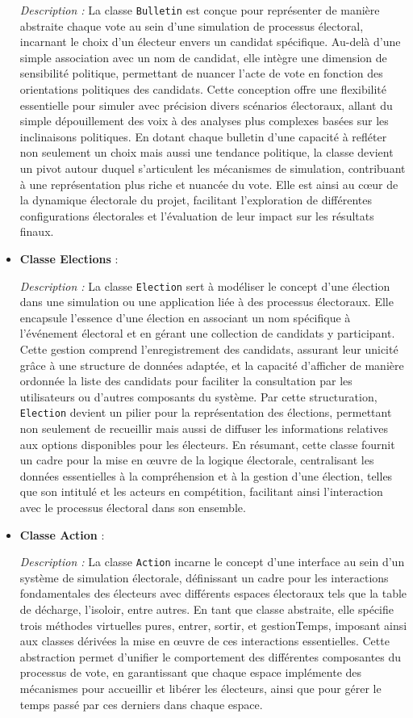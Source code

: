 \documentclass[12pt]{article} %
\begin{document}
\begin{itemize}[leftmargin=*,label={}]
	\textit{Description :} La classe \texttt{Bulletin} est conçue pour représenter de manière abstraite chaque vote au sein d'une simulation de processus électoral, incarnant le choix d'un électeur envers un candidat spécifique. Au-delà d'une simple association avec un nom de candidat, elle intègre une dimension de sensibilité politique, permettant de nuancer l'acte de vote en fonction des orientations politiques des candidats. Cette conception offre une flexibilité essentielle pour simuler avec précision divers scénarios électoraux, allant du simple dépouillement des voix à des analyses plus complexes basées sur les inclinaisons politiques. En dotant chaque bulletin d'une capacité à refléter non seulement un choix mais aussi une tendance politique, la classe devient un pivot autour duquel s'articulent les mécanismes de simulation, contribuant à une représentation plus riche et nuancée du vote. Elle est ainsi au cœur de la dynamique électorale du projet, facilitant l'exploration de différentes configurations électorales et l'évaluation de leur impact sur les résultats finaux.
	\item \textbf{Classe Elections} :
	
	\textit{Description :} La classe \texttt{Election} sert à modéliser le concept d'une élection dans une simulation ou une application liée à des processus électoraux. Elle encapsule l'essence d'une élection en associant un nom spécifique à l'événement électoral et en gérant une collection de candidats y participant. Cette gestion comprend l'enregistrement des candidats, assurant leur unicité grâce à une structure de données adaptée, et la capacité d'afficher de manière ordonnée la liste des candidats pour faciliter la consultation par les utilisateurs ou d'autres composants du système. Par cette structuration, \texttt{Election} devient un pilier pour la représentation des élections, permettant non seulement de recueillir mais aussi de diffuser les informations relatives aux options disponibles pour les électeurs. En résumant, cette classe fournit un cadre pour la mise en œuvre de la logique électorale, centralisant les données essentielles à la compréhension et à la gestion d'une élection, telles que son intitulé et les acteurs en compétition, facilitant ainsi l'interaction avec le processus électoral dans son ensemble.
	
	\item \textbf{Classe Action} :
	
	\textit{Description :} La classe \texttt{Action} incarne le concept d'une interface au sein d'un système de simulation électorale, définissant un cadre pour les interactions fondamentales des électeurs avec différents espaces électoraux tels que la table de décharge, l'isoloir, entre autres. En tant que classe abstraite, elle spécifie trois méthodes virtuelles pures, entrer, sortir, et gestionTemps, imposant ainsi aux classes dérivées la mise en œuvre de ces interactions essentielles. Cette abstraction permet d'unifier le comportement des différentes composantes du processus de vote, en garantissant que chaque espace implémente des mécanismes pour accueillir et libérer les électeurs, ainsi que pour gérer le temps passé par ces derniers dans chaque espace.
	

\end{itemize}
\end{document}
